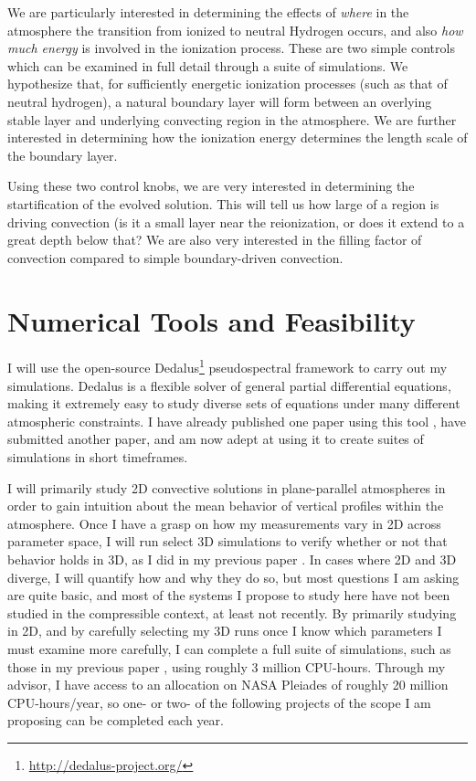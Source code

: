 \documentclass[aasms,12pt]{article}
\begin{document}
We are particularly interested in determining the effects of \emph{where} in the atmosphere the
transition from ionized to neutral Hydrogen occurs, and also \emph{how much energy} is involved in
the ionization process.  These are two simple controls which can be examined in full detail through
a suite of simulations.  We hypothesize that, for sufficiently energetic ionization processes (such as
that of neutral hydrogen), a natural boundary layer will form between an overlying stable layer and
underlying convecting region in the atmosphere.  We are further interested in determining how the
ionization energy determines the length scale of the boundary layer.

Using these two control knobs, we are very interested in determining the startification of the evolved
solution.  This will tell us how large of a region is driving convection (is it a small layer 
near the reionization, or does it extend to a great depth below that?  We are also very interested
in the filling factor of convection compared to simple boundary-driven convection.



\section{Numerical Tools and Feasibility}
I will use the open-source Dedalus\footnote{\url{http://dedalus-project.org/}} pseudospectral framework 
\cite{burns&all2016} to carry out my simulations.  
Dedalus is a flexible solver of general partial differential equations,
making it extremely easy to study diverse sets of equations under many different atmospheric
constraints.  I have already published one paper using this tool \cite{anders&brown2017},
have submitted another paper, and am now adept at using it to create suites of simulations
in short timeframes.

I will primarily study 2D convective solutions in plane-parallel atmospheres in order to gain
intuition about the mean behavior of vertical profiles within the atmosphere.  Once I have a grasp
on how my measurements vary in 2D across parameter space, I will run select 3D simulations to
verify whether or not that behavior holds in 3D, as I did in my previous paper \cite{anders&brown2017}.
In cases where 2D and 3D diverge, I will quantify how and why they do so, but most questions I am
asking are quite basic, and most of the systems I propose to study here have not been studied
in the compressible context, at least not recently.  By primarily studying in 2D, and by carefully
selecting my 3D runs once I know which parameters I must examine more carefully, I can complete
a full suite of simulations, such as those in my previous paper \cite{anders&brown2017}, using
roughly 3 million CPU-hours.  Through my advisor, I have access to an allocation on NASA Pleiades
of roughly 20 million CPU-hours/year, so one- or two- of the following projects of the scope I am
proposing can be completed each year.
\end{document}
